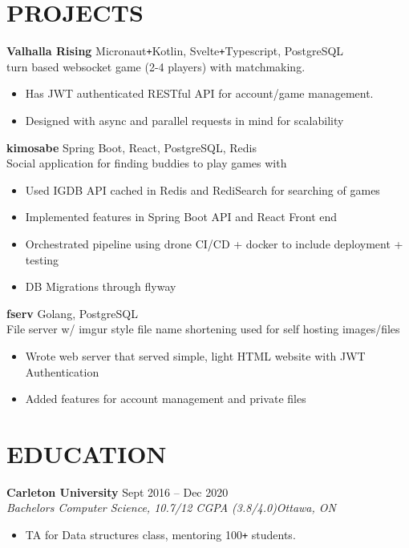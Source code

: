 \documentclass[letterpaper]{article}
\newcommand{\NewPart}[1]{\section*{\uppercase{\large\textbf{#1}}}}
\newcommand{\DatedEntry}[5]{\textbf{#1}
	\hfill \small#2\\
	\textit{#3}\hfill\textit{#4}\\\vspace{0.1cm}
	#5\vspace{0.1cm}
}
\newcommand{\ProjectEntry}[4]{\textbf{#1}
	\hfill \small{#2}\\
	#3\\\vspace{0.1cm}
	#4\vspace{0.1cm}
}
\begin{document}
\NewPart{Projects}{}
\ProjectEntry{Valhalla Rising}
{Micronaut\texttt{+}Kotlin, Svelte\texttt{+}Typescript, PostgreSQL}
{turn based websocket game (2-4 players) with matchmaking.}
{\begin{itemize}
	\item Has JWT authenticated RESTful API for account/game management.
	\item Designed with async and parallel requests in mind for scalability
\end{itemize}}
\ProjectEntry{kimosabe}
{Spring Boot, React, PostgreSQL, Redis}
{Social application for finding buddies to play games with}
{\begin{itemize}
	\item Used IGDB API cached in Redis and RediSearch for searching of games
	\item Implemented features in Spring Boot API and React Front end
	\item Orchestrated pipeline using drone CI/CD + docker to include deployment + testing
	\item DB Migrations through flyway
\end{itemize}}
\ProjectEntry{fserv}
{Golang, PostgreSQL}
{File server w/ imgur style file name shortening used for self hosting images/files}
{\begin{itemize}
	\item Wrote web server that served simple, light HTML website with JWT Authentication
	\item Added features for account management and private files
\end{itemize}}\vspace{-0.3cm}

\NewPart{Education}{}
\DatedEntry{Carleton University}
{Sept 2016 -- Dec 2020}
{Bachelors Computer Science, 10.7/12 CGPA (3.8/4.0)}
{Ottawa, ON}
{\begin{itemize}
	\item TA for Data structures class, mentoring 100\texttt{+} students.
\end{itemize}}
\end{document}
